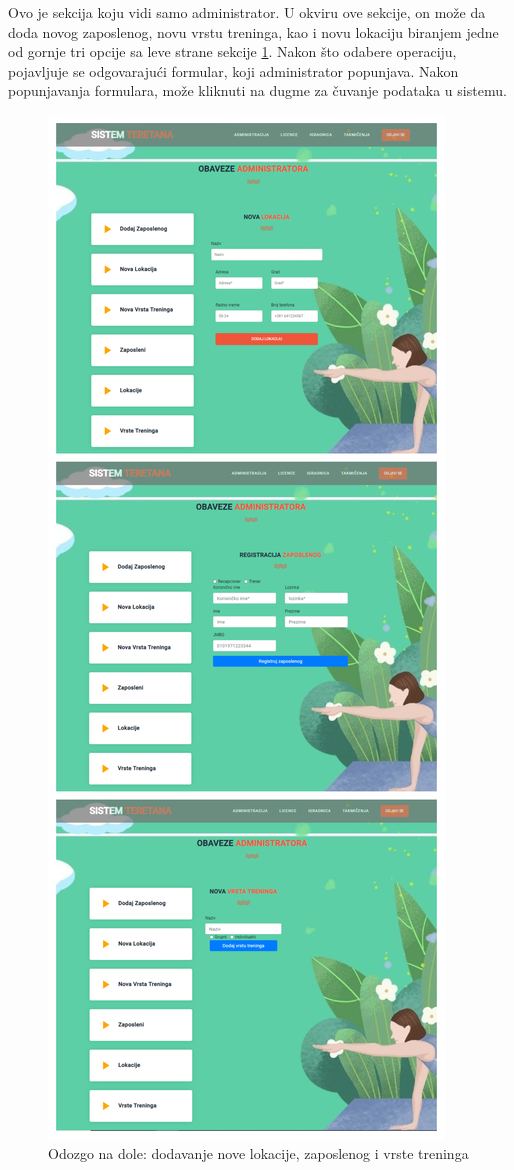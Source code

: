 \documentclass[../main.tex]{subfiles}
\begin{document}
Ovo je sekcija koju vidi samo administrator. U okviru ove sekcije, on može da doda novog zaposlenog, novu vrstu treninga, kao i novu lokaciju biranjem jedne od gornje tri opcije sa leve strane sekcije \ref{fig:administrator_novi}. Nakon što odabere operaciju, pojavljuje se odgovarajući formular, koji administrator popunjava. Nakon popunjavanja formulara, može kliknuti na dugme za čuvanje podataka u sistemu.

\begin{figure}[!ht]
\begin{center}
\includegraphics[scale=0.35]{sections/korisnicki_interfejs/screenshots/administrator_novi_uspravno.png}
\end{center}
\caption{Odozgo na dole: dodavanje nove lokacije, zaposlenog i vrste treninga }
\label{fig:administrator_novi}
\end{figure}
\end{document}
